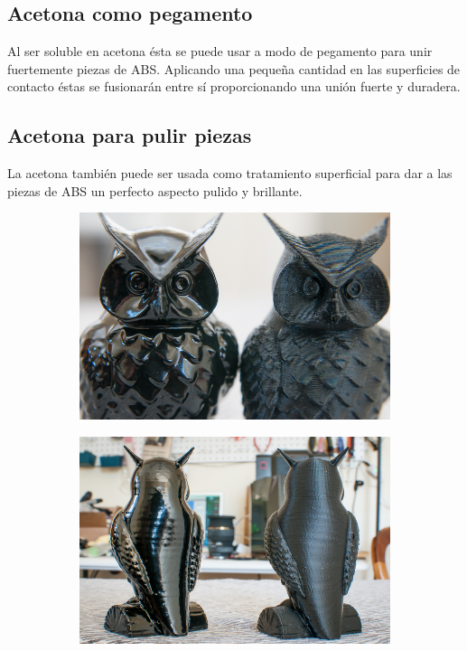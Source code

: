 \documentclass[11pt,a4paper]{article}
\begin{document}
	\subsection{Acetona como pegamento}Al ser soluble en acetona ésta se puede usar a modo de pegamento para unir fuertemente piezas de ABS. Aplicando una pequeña cantidad en las superficies de contacto éstas se fusionarán entre sí proporcionando una unión fuerte y duradera. 
	\subsection{Acetona para pulir piezas}La acetona también puede ser usada como tratamiento superficial para dar a las piezas de ABS un perfecto aspecto pulido y brillante.
\begin{figure}[H]
    \centering
    \begin{subfigure}[b]{0.4\textwidth}
        \includegraphics[width=\textwidth,cfbox=azul_marcos 4pt 0pt]{FOTOS/VAPORACETONA1}
    \end{subfigure}
    \qquad %
    \begin{subfigure}[b]{0.4\textwidth}
        \includegraphics[width=\textwidth,cfbox=azul_marcos 4pt 0pt]{FOTOS/VAPORACETONA2}
    \end{subfigure}   
\end{figure}
\end{document}
